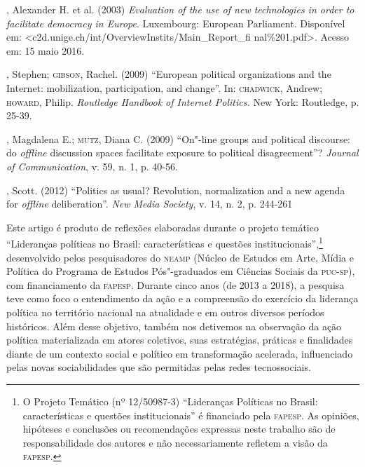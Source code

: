 \begin{bibliohedra}
, Alexander H. et al. (2003) \emph{Evaluation of the use of new
technologies in order to facilitate democracy in Europe}. Luxembourg:
European Parliament. Disponível em:
\textless{}c2d.unige.ch/int/OverviewInstits/Main\_Report\_fi
nal\%201.pdf\textgreater{}. Acesso em: 15 maio 2016.

, Stephen; \textsc{gibson}, Rachel. (2009) ``European political organizations
and the Internet: mobilization, participation, and change''. In:
\textsc{chadwick}, Andrew; \textsc{howard}, Philip. \emph{Routledge Handbook of Internet
Politics.} New York: Routledge, p. 25-39.

, Magdalena E.; \textsc{mutz}, Diana C. (2009) ``On"-line groups and
political discourse: do \emph{offline} discussion spaces facilitate exposure to
political disagreement''? \emph{Journal of Communication}, v. 59, n. 1,
p. 40-56.

, Scott. (2012) ``Politics as usual? Revolution, normalization and
a new agenda for \emph{offline} deliberation''. \emph{New Media Society}, v.
14, n. 2, p. 244-261
\end{bibliohedra}




\noindent{}Este artigo é produto de reflexões elaboradas durante o projeto temático
``Lideranças políticas no Brasil: características e questões
institucionais'',\footnote{O Projeto Temático (nº 12/50987-3)
  ``Lideranças Políticas no Brasil: características e questões
  institucionais'' é financiado pela \textsc{fapesp}. As opiniões, hipóteses e
  conclusões ou recomendações expressas neste trabalho são de
  responsabilidade dos autores e não necessariamente refletem a visão da
  \textsc{fapesp}.} desenvolvido pelos pesquisadores do \textsc{neamp} (Núcleo de Estudos
em Arte, Mídia e Política do Programa de Estudos Pós"-graduados em
Ciências Sociais da \textsc{puc}-\textsc{sp}), com financiamento da \textsc{fapesp}. Durante cinco
anos (de 2013 a 2018), a pesquisa teve como foco o entendimento da ação
e a compreensão do exercício da liderança política no território
nacional na atualidade e em outros diversos períodos históricos. Além
desse objetivo, também nos detivemos na observação da ação política
materializada em atores coletivos, suas estratégias, práticas e
finalidades diante de um contexto social e político em transformação
acelerada, influenciado pelas novas sociabilidades que são permitidas
pelas redes tecnossociais.

